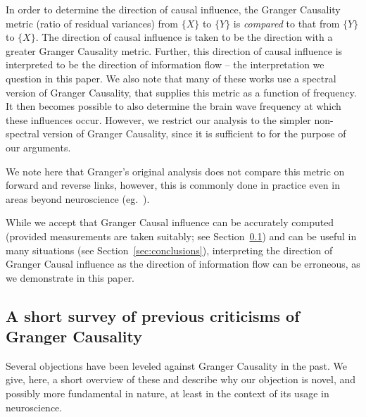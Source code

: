 \documentclass[letterpaper, 10pt, conference]{ieeeconf}
\begin{document}
In order to determine the direction of causal influence, the Granger Causality metric (ratio of residual variances) from $\{X\}$ to $\{Y\}$ is \emph{compared} to that from $\{Y\}$ to $\{X\}$. The direction of causal influence is taken to be the direction with a greater Granger Causality metric. Further, this direction of causal influence is interpreted to be the direction of information flow -- the interpretation we question in this paper. We also note that many of these works use a spectral version of Granger Causality, that supplies this metric as a function of frequency. It then becomes possible to also determine the brain wave frequency at which these influences occur. However, we restrict our analysis to the simpler non-spectral version of Granger Causality, since it is sufficient to for the purpose of our arguments.

We note here that Granger's original analysis does not compare this metric on forward and reverse links, however, this is commonly done in practice even in areas beyond neuroscience (eg.~\cite{Brovelli2004BetaOscillations,jiao2013universal}).

While we accept that Granger Causal influence can be accurately computed (provided measurements are taken suitably; see Section~\ref{sec:previous-criticisms-of-gc}) and can be useful in many situations (see Section~\ref{sec:conclusions}), interpreting the direction of Granger Causal influence as the direction of information flow can be erroneous, as we demonstrate in this paper.


\subsection{A short survey of previous criticisms of Granger Causality}
\label{sec:previous-criticisms-of-gc}

Several objections have been leveled against Granger Causality in the past. We give, here, a short overview of these and describe why our objection is novel, and possibly more fundamental in nature, at least in the context of its usage in neuroscience.
\end{document}
